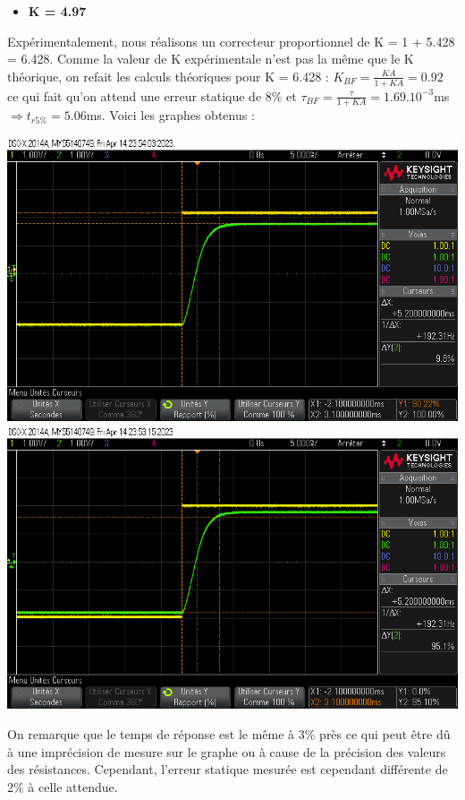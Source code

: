 \documentclass[12pt]{article}
\begin{document}
 \begin{itemize}
\item \bf \large K = 4.97
\end{itemize}
Expérimentalement, nous réalisons un correcteur proportionnel de K = 1 + 5.428 = 6.428.
Comme la valeur de K expérimentale n'est pas la même que le K théorique, on refait les calculs théoriques pour K = 6.428 :
$K_{BF} = \frac{KA}{1+KA}  = 0.92$ ce qui fait qu'on attend une erreur statique de 8$\%$ et $\tau_{BF} = \frac{\tau}{1 + KA} = 1.69.10^{-3}$ms $\Rightarrow t_{r5\%} = 5.06$ms.
Voici les graphes obtenus :
\begin{center}
    \includegraphics[width = 16 cm]{TP3/Syst_1/P/14_04_2023_es_k5.png}
    \includegraphics[width = 16 cm]{TP3/Syst_1/P/14_04_2023_tr_k5.png}
\end{center}
On remarque que le temps de réponse est le même à 3$\%$ près ce qui peut être dû à une imprécision de mesure sur le graphe ou à cause de la précision des valeurs des résistances. Cependant, l'erreur statique mesurée est cependant différente de 2$\%$ à celle attendue.
\end{document}
